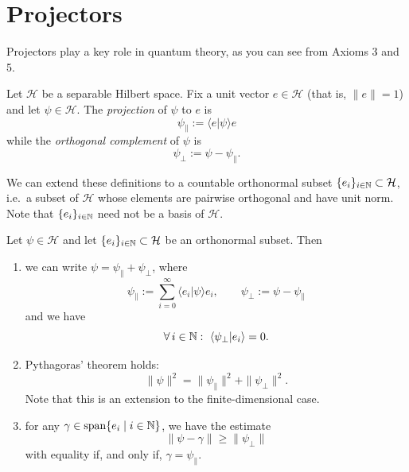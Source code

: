 
\section{Projectors}

Projectors play a key role in quantum theory, as you can see from Axioms 3 and 5.

\begin{definition}
Let $\mathcal{H}$ be a separable Hilbert space. Fix a unit vector $e\in\mathcal{H}$ (that is, $\|e\|=1$) and let $\psi\in \mathcal{H}$. The \emph{projection} of $\psi$ to $e$ is
\begin{equation*}
\psi_{\parallel} := \langle e| \psi \rangle e
\end{equation*}
while the \emph{orthogonal complement} of $\psi$ is
\begin{equation*}
\psi_{\perp}:=\psi-\psi_{\parallel}.
\end{equation*}
\end{definition}
We can extend these definitions to a countable orthonormal subset $\{e_i\}_{i\in \mathbb{N}}\subset\mathcal{H}$, i.e.\ a subset of $\mathcal{H}$ whose elements are pairwise orthogonal and have unit norm. Note that $\{e_i\}_{i\in \mathbb{N}}$ need not be a basis of $\mathcal{H}$.

\begin{proposition}
Let $\psi\in \mathcal{H}$ and let $\{e_i\}_{i\in \mathbb{N}}\subset \mathcal{H}$ be an orthonormal subset. Then
\begin{enumerate}[label=(\alph*)]
\item we can write $\psi = \psi_{\parallel}+\psi_{\perp}$, where
\begin{equation*}
\psi_{\parallel}:= \sum_{i=0}^{\infty}\langle e_i | \psi \rangle e_i, \qquad \psi_{\perp} :=\psi-\psi_{\parallel}
\end{equation*}
and we have
\begin{equation*}
\forall \, i\in \mathbb{N} : \ \langle \psi_{\perp} | e_i\rangle = 0.
\end{equation*}
\item Pythagoras' theorem holds:
\begin{equation*}
\|\psi\|^2 = \|\psi_{\parallel}\|^2+\|\psi_{\perp}\|^2.
\end{equation*}
Note that this is an extension to the finite-dimensional case.
\item for any $\gamma\in\operatorname{span}\{e_i\mid i\in \mathbb{N}\}$, we have the estimate
\begin{equation*}
\|\psi-\gamma\| \geq \|\psi_{\perp}\|
\end{equation*}
with equality if, and only if, $\gamma =\psi_{\parallel}$.
\end{enumerate}
\end{proposition}

